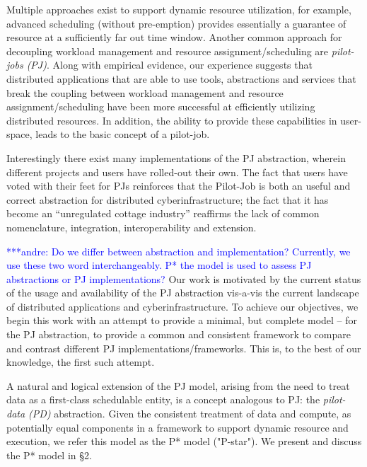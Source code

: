 \documentclass[conference,final]{IEEEtran}
\newcommand{\jhanote}[1]{ {\textcolor{red} { ***shantenu: #1 }}}
\newcommand{\alnote}[1]{ {\textcolor{blue} { ***andre: #1 }}}
\newcommand{\alnote}[1]{}
\newcommand{\jhanote}[1]{}
\begin{document}
Multiple approaches exist to support dynamic resource utilization, for
example, advanced scheduling (without pre-emption) provides
essentially a guarantee of resource %
at a sufficiently far out time window.  Another common approach for
decoupling workload management and resource assignment/scheduling are
\emph{pilot-jobs (PJ)}. Along with empirical evidence, our experience
suggests that distributed applications that are able to use tools,
abstractions and services that break the coupling between workload
management and resource assignment/scheduling have been more
successful at efficiently utilizing distributed resources. In
addition, the ability to provide these capabilities in user-space,
leads to the basic concept of a pilot-job.


Interestingly there exist many implementations of the PJ
abstraction, wherein different projects and users have rolled-out
their own. The fact that users have voted with their feet for
PJs reinforces that the Pilot-Job is both an useful
and correct abstraction for distributed cyberinfrastructure; the fact
that it has become an ``unregulated cottage industry'' reaffirms the
lack of common nomenclature, integration, interoperability and
extension.

\alnote{Do we differ between abstraction and implementation? Currently,
we use these two word interchangeably. P* the model is used to assess PJ
abstractions or PJ implementations? }
Our work is motivated by the current status of the usage and
availability of the PJ abstraction vis-a-vis the current
landscape of distributed applications and cyberinfrastructure.
To achieve our objectives, we begin this work with an attempt to
provide a minimal, but complete model -- for the PJ
abstraction, to provide a common and consistent framework to compare
and contrast different PJ implementations/frameworks. This is,
to the best of our knowledge, the first such attempt.

A natural and logical extension of the PJ model, arising from the need to treat
data as a first-class schedulable entity, is a concept analogous to PJ: the
\emph{pilot-data (PD)} abstraction. Given the consistent treatment of data and
compute, as potentially equal components in a framework to support dynamic
resource and execution, we refer this model as the P* model ("P-star"). We 
present and discuss the P* model in \S2.
\end{document}
